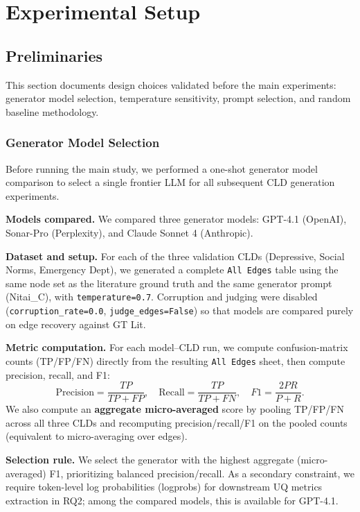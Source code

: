 \section{Experimental Setup}

\subsection{Preliminaries}

This section documents design choices validated before the main experiments: generator model selection, temperature sensitivity, prompt selection, and random baseline methodology.

\subsubsection{Generator Model Selection}

Before running the main study, we performed a one-shot generator model comparison to select a single frontier LLM for all subsequent CLD generation experiments.

\textbf{Models compared.} We compared three generator models: GPT-4.1 (OpenAI), Sonar-Pro (Perplexity), and Claude Sonnet 4 (Anthropic).

\textbf{Dataset and setup.} For each of the three validation CLDs (Depressive, Social Norms, Emergency Dept), we generated a complete \texttt{All Edges} table using the same node set as the literature ground truth and the same generator prompt (Nitai\_C), with \texttt{temperature=0.7}. Corruption and judging were disabled (\texttt{corruption\_rate=0.0}, \texttt{judge\_edges=False}) so that models are compared purely on edge recovery against GT Lit.

\textbf{Metric computation.} For each model--CLD run, we compute confusion-matrix counts (TP/FP/FN) directly from the resulting \texttt{All Edges} sheet, then compute precision, recall, and F1:
\[
\text{Precision}=\frac{TP}{TP+FP},\quad
\text{Recall}=\frac{TP}{TP+FN},\quad
F1=\frac{2PR}{P+R}.
\]
We also compute an \textbf{aggregate micro-averaged} score by pooling TP/FP/FN across all three CLDs and recomputing precision/recall/F1 on the pooled counts (equivalent to micro-averaging over edges).

\textbf{Selection rule.} We select the generator with the highest aggregate (micro-averaged) F1, prioritizing balanced precision/recall. As a secondary constraint, we require token-level log probabilities (logprobs) for downstream UQ metrics extraction in RQ2; among the compared models, this is available for GPT-4.1.

